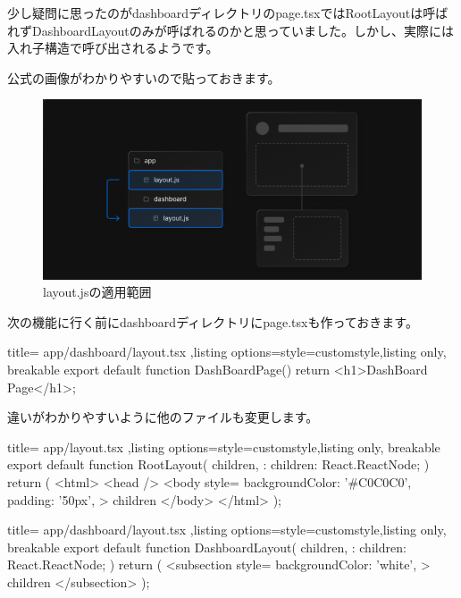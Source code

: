 少し疑問に思ったのがdashboardディレクトリのpage.tsxではRootLayoutは呼ばれずDashboardLayoutのみが呼ばれるのかと思っていました。しかし、実際には入れ子構造で呼び出されるようです。

公式の画像がわかりやすいので貼っておきます。
\begin{figure}[H]
  \centering
  \includegraphics[width=12cm]{./image/03-Tech/chap4/02.png}
  \caption{layout.jsの適用範囲}
\end{figure}

次の機能に行く前にdashboardディレクトリにpage.tsxも作っておきます。
\begin{tcblisting}{title={
        app/dashboard/layout.tsx
      },listing options={style=customstyle},listing only, breakable}
  export default function DashBoardPage() {
      return <h1>DashBoard Page</h1>;
  }

\end{tcblisting}


違いがわかりやすいように他のファイルも変更します。
\begin{tcblisting}{title={
        app/layout.tsx
      },listing options={style=customstyle},listing only, breakable}
      export default function RootLayout({
        children,
      }: {
        children: React.ReactNode;
      }) {
        return (
          <html>
            <head />
            <body
              style={{
                backgroundColor: '#C0C0C0',
                padding: '50px',
              }}
            >
              {children}
            </body>
          </html>
        );
      }
      

\end{tcblisting}




\begin{tcblisting}{title={
        app/dashboard/layout.tsx
      },listing options={style=customstyle},listing only, breakable}
      export default function DashboardLayout({
        children,
      }: {
        children: React.ReactNode;
      }) {
        return (
          <subsection
            style={{
              backgroundColor: 'white',            
            }}
          >
            {children}
          </subsection>
        );
      }
\end{tcblisting}



